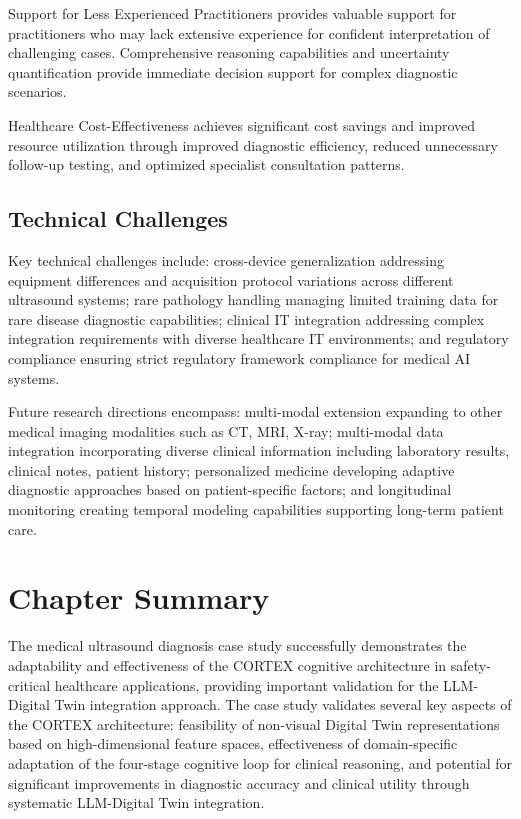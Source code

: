 Support for Less Experienced Practitioners provides valuable support for practitioners who may lack extensive experience for confident interpretation of challenging cases. Comprehensive reasoning capabilities and uncertainty quantification provide immediate decision support for complex diagnostic scenarios.

Healthcare Cost-Effectiveness achieves significant cost savings and improved resource utilization through improved diagnostic efficiency, reduced unnecessary follow-up testing, and optimized specialist consultation patterns.

\subsection{Technical Challenges}

Key technical challenges include: cross-device generalization addressing equipment differences and acquisition protocol variations across different ultrasound systems; rare pathology handling managing limited training data for rare disease diagnostic capabilities; clinical IT integration addressing complex integration requirements with diverse healthcare IT environments; and regulatory compliance ensuring strict regulatory framework compliance for medical AI systems.

Future research directions encompass: multi-modal extension expanding to other medical imaging modalities such as CT, MRI, X-ray; multi-modal data integration incorporating diverse clinical information including laboratory results, clinical notes, patient history; personalized medicine developing adaptive diagnostic approaches based on patient-specific factors; and longitudinal monitoring creating temporal modeling capabilities supporting long-term patient care.

\section{Chapter Summary}

The medical ultrasound diagnosis case study successfully demonstrates the adaptability and effectiveness of the CORTEX cognitive architecture in safety-critical healthcare applications, providing important validation for the LLM-Digital Twin integration approach. The case study validates several key aspects of the CORTEX architecture: feasibility of non-visual Digital Twin representations based on high-dimensional feature spaces, effectiveness of domain-specific adaptation of the four-stage cognitive loop for clinical reasoning, and potential for significant improvements in diagnostic accuracy and clinical utility through systematic LLM-Digital Twin integration.

